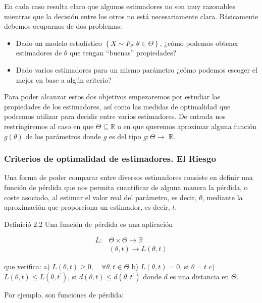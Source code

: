 \documentclass[
]{article}
\providecommand{\tightlist}{%
  \setlength{\itemsep}{0pt}\setlength{\parskip}{0pt}}
\begin{document}
En cada caso resulta claro que algunos estimadores no son muy razonables mientras que la decisión entre los otros no está necesariamente clara. Básicamente debemos ocuparnos de dos problemas:

\begin{itemize}
\tightlist
\item
  Dado un modelo estadístico \(\left\{X \sim F_{\theta}: \theta \in \Theta\right\}\), ¿cómo podemos obtener estimadores de \(\theta\) que tengan ``buenas'' propiedades?
\item
  Dado varios estimadores para un mismo parámetro ¿cómo podemos escoger el mejor en base a algún criterio?
\end{itemize}

Para poder alcanzar estos dos objetivos empezaremos por estudiar las propiedades de los estimadores, así como las medidas de optimalidad que podremos utilizar para decidir entre varios estimadores.
De entrada nos restringiremos al caso en que \(\Theta \subseteq \mathbb{R}\) o en que queremos aproximar alguna función \(g(\theta)\) de los parámetros donde \(g\) es del tipo \(g: \Theta \rightarrow\) \(\mathbb{R}\).

\subsubsection{Criterios de optimalidad de estimadores. El Riesgo}\label{criterios-de-optimalidad-de-estimadores.-el-riesgo}

Una forma de poder comparar entre diversos estimadores consiste en definir una función de pérdida que nos permita cuantificar de alguna manera la pérdida, o coste asociado, al estimar el valor real del parámetro, es decir, \(\theta\), mediante la aproximación que proporciona un estimador, es decir, \(t\).

Definició 2.2 Una función de pérdida es una aplicación

\[
\begin{aligned}
L: & \Theta \times \Theta \rightarrow \mathbb{R} \\
& (\theta, t) \rightarrow L(\theta, t)
\end{aligned}
\]

que verifica:
a) \(L(\theta, t) \geq 0, \quad \forall \theta, t \in \Theta\)
b) \(L(\theta, t)=0\), si \(\theta=t\)
c) \(L(\theta, t) \leq L\left(\theta, t^{\prime}\right)\), si \(d(\theta, t) \leq d\left(\theta, t^{\prime}\right)\) donde \(d\) es una distancia en \(\Theta\).

Por ejemplo, son funciones de pérdida:
\end{document}

